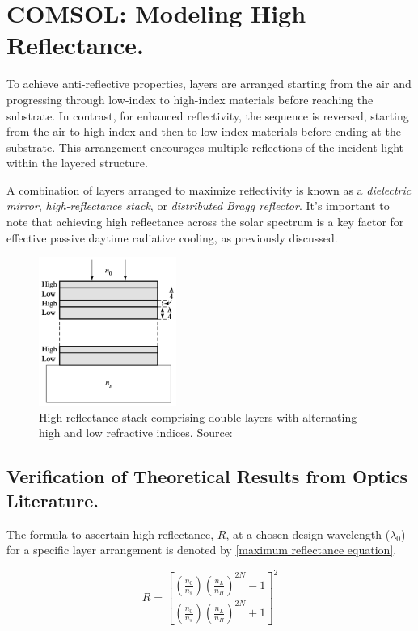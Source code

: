 \section{COMSOL: Modeling High Reflectance.}
To achieve anti-reflective properties, layers are arranged starting from the air and progressing through low-index to high-index materials before reaching the substrate. In contrast, for enhanced reflectivity, the sequence is reversed, starting from the air to high-index and then to low-index materials before ending at the substrate. This arrangement encourages multiple reflections of the incident light within the layered structure.

A combination of layers arranged to maximize reflectivity is known as a \emph{dielectric mirror}, \emph{high-reflectance stack}, or \emph{distributed Bragg reflector}. It's important to note that achieving high reflectance across the solar spectrum is a key factor for effective passive daytime radiative cooling, as previously discussed.

\begin{figure}[ht!]
  \centering
  \includegraphics[width=0.4\textwidth]{Chapters/Figures/Chapter 4 Figures/High-Reflectance Stack of Double Layers.png}
  \caption{High-reflectance stack comprising double layers with alternating high and low refractive indices. Source: \cite{pedrotti_introduction_2007}}
  \label{fig:visualizing high-reflectance stack with alternating indices}
\end{figure}

\subsection{Verification of Theoretical Results from Optics Literature.}
The formula to ascertain high reflectance, $R$, at a chosen design wavelength ($\lambda_0$) for a specific layer arrangement is denoted by \ref{maximum reflectance equation}.

\begin{equation}\label{formula for optimal reflectance - chap4}
    R = \left[ \frac{ \left( \frac{n_0}{n_s} \right) \left( \frac{n_L}{n_H} \right)^{2N}  - 1 }{  \left( \frac{n_0}{n_s} \right) \left( \frac{n_L}{n_H} \right)^{2N}  + 1}  \right]^2
\end{equation}

